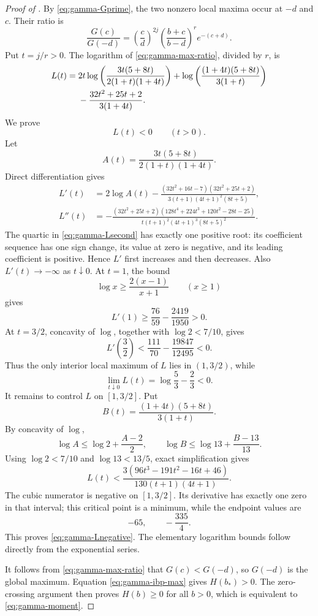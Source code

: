 \documentclass[11pt]{article}
\begin{document}
\begin{proof}[Proof of ]
By \eqref{eq:gamma-Gprime}, the two nonzero local maxima occur at \(-d\) and
\(c\).  Their ratio is
\begin{equation}\label{eq:gamma-max-ratio}
 \frac{G(c)}{G(-d)}
 =\left(\frac cd\right)^{2j}
  \left(\frac{b+c}{b-d}\right)^r e^{-(c+d)}.
\end{equation}
Put \(t=j/r>0\).  The logarithm of \eqref{eq:gamma-max-ratio}, divided by
\(r\), is
\begin{align}
 L(t)={}&2t\log\left(
 \frac{3t(5+8t)}{2(1+t)(1+4t)}\right)
 +\log\left(
 \frac{(1+4t)(5+8t)}{3(1+t)}\right)\notag\\
 &-\frac{32t^2+25t+2}{3(1+4t)}.
 \label{eq:gamma-L}
\end{align}
We prove
\begin{equation}\label{eq:gamma-Lnegative}
       L(t)<0\qquad(t>0).
\end{equation}
Let
\[
       A(t)=\frac{3t(5+8t)}{2(1+t)(1+4t)}.
\]
Direct differentiation gives
\begin{align}
 L'(t)
 &=2\log A(t)
 -\frac{(32t^2+16t-7)(32t^2+25t+2)}
 {3(t+1)(4t+1)^2(8t+5)},\label{eq:gamma-Lprime}\\
 L''(t)
 &=-\frac{(32t^2+25t+2)
 (128t^4+224t^3+120t^2-28t-25)}
 {t(t+1)^2(4t+1)^3(8t+5)^2}.
 \label{eq:gamma-Lsecond}
\end{align}
The quartic in \eqref{eq:gamma-Lsecond} has exactly one positive root: its
coefficient sequence has one sign change, its value at zero is negative, and
its leading coefficient is positive.  Hence \(L'\) first increases and then
decreases.  Also \(L'(t)\to-\infty\) as \(t\downarrow0\).  At \(t=1\), the
bound
\[
       \log x\ge\frac{2(x-1)}{x+1}\qquad(x\ge1)
\]
gives
\[
       L'(1)\ge\frac{76}{59}-\frac{2419}{1950}>0.
\]
At \(t=3/2\), concavity of \(\log\), together with \(\log2<7/10\), gives
\[
       L'\left(\frac32\right)
       <\frac{111}{70}-\frac{19847}{12495}<0.
\]
Thus the only interior local maximum of \(L\) lies in \((1,3/2)\), while
\[
       \lim_{t\downarrow0}L(t)=\log\frac53-\frac23<0.
\]
It remains to control \(L\) on \([1,3/2]\).  Put
\[
       B(t)=\frac{(1+4t)(5+8t)}{3(1+t)}.
\]
By concavity of \(\log\),
\[
 \log A\le\log2+\frac{A-2}{2},
 \qquad
 \log B\le\log13+\frac{B-13}{13}.
\]
Using \(\log2<7/10\) and \(\log13<13/5\), exact simplification gives
\begin{equation}\label{eq:gamma-L-rational}
 L(t)<
 \frac{3(96t^3-191t^2-16t+46)}
      {130(t+1)(4t+1)}.
\end{equation}
The cubic numerator is negative on \([1,3/2]\).  Its derivative has exactly
one zero in that interval; this critical point is a minimum, while the
endpoint values are
\[
       -65,
       \qquad -\frac{335}{4}.
\]
This proves \eqref{eq:gamma-Lnegative}.  The elementary logarithm bounds
follow directly from the exponential series.

It follows from \eqref{eq:gamma-max-ratio} that \(G(c)<G(-d)\), so
\(G(-d)\) is the global maximum.  Equation \eqref{eq:gamma-ibp-max} gives
\(H(b_*)>0\).  The zero-crossing argument then proves \(H(b)\ge0\) for all
\(b>0\), which is equivalent to \eqref{eq:gamma-moment}.
\end{proof}
\end{document}
